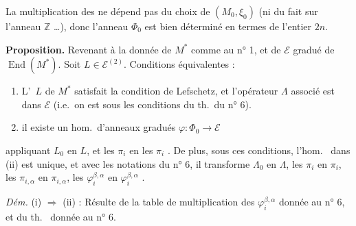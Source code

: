 \documentclass[11pt,a4paper]{article}
\begin{document}
 

La multiplication des  ne dépend pas du choix de
$(M_{0}, \xi_{0})$ (ni du fait  sur l'anneau $\mathbb{Z}$ \ldots),
donc l'anneau $\Phi_{0}$ est bien déterminé en termes de l'entier 
$2n$.

\textbf{Proposition.} Revenant à la donnée de $M^{*}$ comme au n° 1, et de
$\mathcal{E}$ \struck{\ill{}} gradué de \struck{\ill{}}
$\operatorname{End}(M^{*})$. Soit $L \in \mathcal{E}^{(2)}$.
Conditions équivalentes :

\begin{enumerate}
  \item L'\ $L$ de $M^{*}$ satisfait la condition de 
        Lefschetz, et l'opérateur $\Lambda$ associé est dans $\mathcal{E}$ (i.e.\ on
        est sous les conditions du th.\ du n° 6).
  \item il existe un hom.\ d'anneaux gradués
        $\varphi \colon \Phi_{0} \to \mathcal{E}$
\end{enumerate}


appliquant $L_{0}$ en $L$, et les $\pi_{i}$ en les $\pi_{i}$
\struck{\ill{}} .  De plus, sous ces
conditions, l'hom.\ \struck{\ill{}} dans (ii) est unique, et avec les notations du n° 6,
il transforme $\Lambda_{0}$ en $\Lambda$, les $\pi_{i}$ en $\pi_{i}$, les
$\pi_{i,\alpha}$ en $\pi_{i,\alpha}$, les $\varphi^{\beta,\alpha}_{i}$ en
$\varphi^{\beta,\alpha}_{i}$ \struck{\ill{}}.



\emph{Dém.} (i) $\Rightarrow$ (ii) : Résulte de la table de
multiplication des $\varphi^{\beta,\alpha}_{i}$ donnée au n° 6, et du th.\
\ill{} donnée au n° 6.
\end{document}

